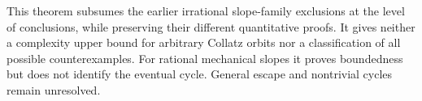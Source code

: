 \documentclass[10pt]{article}
\begin{document}
This theorem subsumes the earlier irrational slope-family exclusions at
the level of conclusions, while preserving their different quantitative
proofs. It gives neither a complexity upper bound for arbitrary Collatz
orbits nor a classification of all possible counterexamples. For rational
mechanical slopes it proves boundedness but does not identify the eventual
cycle. General escape and nontrivial cycles remain unresolved.
\end{document}
